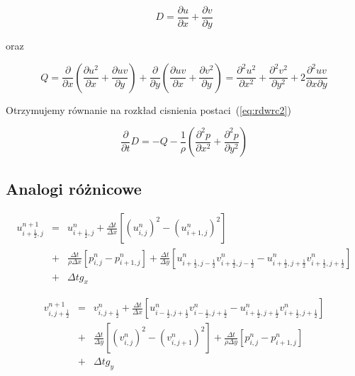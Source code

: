 \documentclass[a4paper,10pt]{article}
\begin{document}
	\begin{equation}
		D = \frac{\partial u}{\partial x} + \frac{\partial v}{\partial y}
	\end{equation}

	oraz

	\begin{equation}
		Q = \frac{\partial}{\partial x} \left (  \frac{\partial u^2}{\partial x} + \frac{\partial uv}{\partial y} \right )
		+ \frac{\partial}{\partial y} \left (  \frac{\partial uv}{\partial x} + \frac{\partial v^2}{\partial y} \right )
		= \frac{\partial^2 u^2}{\partial x^2} + \frac{\partial^2 v^2}{\partial y^2} + 2\frac{\partial^2 uv}{\partial x\partial y}
	\end{equation}

	Otrzymujemy równanie na rozkład cisnienia postaci~(\ref{eq:rdwrc2})

	\begin{equation}
		\label{eq:rdwrc2}
		\frac{\partial}{\partial t}D = -Q - \frac{1}{\rho} \left ( \frac{\partial^2 p}{\partial x^2} + \frac{\partial^2 p}{\partial y^2} \right )
	\end{equation}

  \subsection{Analogi różnicowe}

	\begin{eqnarray}
		u^{n+1}_{i+\frac{1}{2},j} & = & u^{n}_{i+\frac{1}{2},j} + \frac{\Delta t}{\Delta x} \left [ (u^{n}_{i,j})^2 - (u^{n}_{i+1,j})^2 \right ] \\
			\nonumber & + & \frac{\Delta t}{\rho \Delta x} \left [ p^{n}_{i,j} - p^{n}_{i+1,j}  \right ] + \frac{\Delta t}{\Delta y} \left [ u^n_{i+\frac{1}{2},j-\frac{1}{2}} v^n_{i+\frac{1}{2},j-\frac{1}{2}} - u^n_{i+\frac{1}{2},j+\frac{1}{2}} v^n_{i+\frac{1}{2},j+\frac{1}{2}} \right ] \\
			\nonumber & + & \Delta t g_x
	\end{eqnarray}

	\begin{eqnarray}
		v^{n+1}_{i,j+\frac{1}{2}} & = & v^{n}_{i,j+\frac{1}{2}} + \frac{\Delta t}{\Delta x} \left [ u^n_{i-\frac{1}{2},j+\frac{1}{2}} v^n_{i-\frac{1}{2},j+\frac{1}{2}} - u^n_{i+\frac{1}{2},j+\frac{1}{2}} v^n_{i+\frac{1}{2},j+\frac{1}{2}} \right ]\\
			\nonumber & + & \frac{\Delta t}{\Delta y} \left [ (v^{n}_{i,j})^2 - (v^{n}_{i,j+1})^2 \right ] + \frac{\Delta t}{\rho \Delta y} \left [ p^{n}_{i,j} - p^{n}_{i+1,j}  \right ] \\
			\nonumber & + & \Delta t g_y
	\end{eqnarray}
\end{document}
